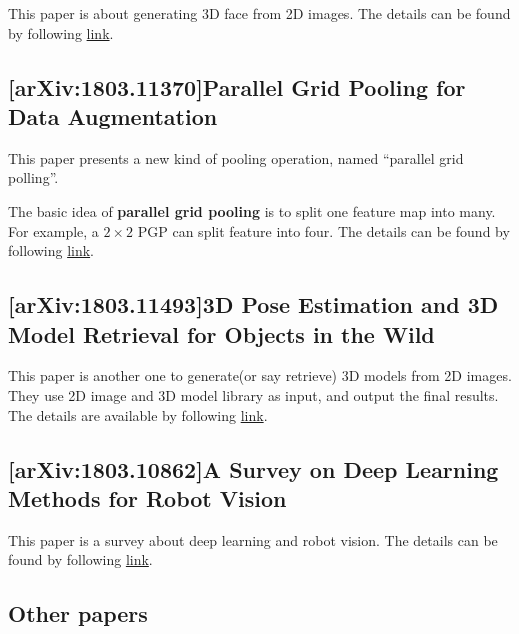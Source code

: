 This paper is about generating 3D face from 2D images. The details can be found
by following \href{https://arxiv.org/abs/1803.11366}{link}.

\subsection{[arXiv:1803.11370]Parallel Grid Pooling for Data Augmentation}

This paper presents a new kind of pooling operation, named ``parallel grid
polling''.

The basic idea of \textbf{parallel grid pooling} is to split one feature map
into many. For example, a $2 \times 2$ PGP can split feature into four.
The details can be found by following
\href{https://arxiv.org/abs/1803.11370}{link}.

\subsection{[arXiv:1803.11493]3D Pose Estimation and 3D Model Retrieval for Objects in the Wild}

This paper is another one to generate(or say retrieve) 3D models from 2D images.
They use 2D image and 3D model library as input, and output the final results.
The details are available by following \href{https://arxiv.org/abs/1803.11493}{link}.

\subsection{[arXiv:1803.10862]A Survey on Deep Learning Methods for Robot
  Vision}

This paper is a survey about deep learning and robot vision. The details can be
found by following \href{https://arxiv.org/abs/1803.10862}{link}.

\subsection{Other papers}

